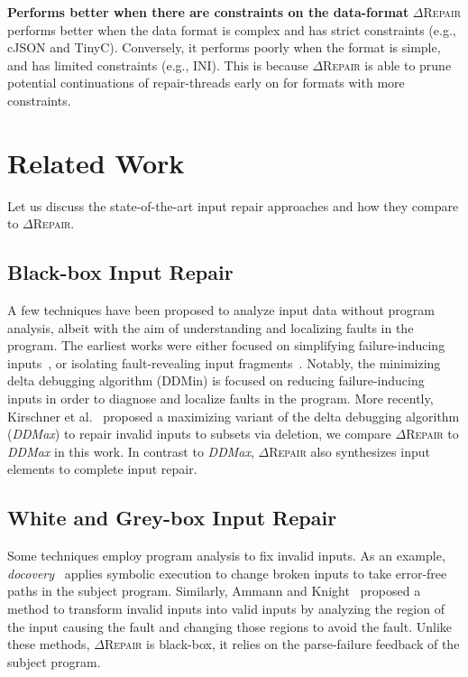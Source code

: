 \documentclass[acmsmall,screen,review,anonymous]{acmart}
\newcommand{\ddmin}{\textit{ddmin}\xspace}
\newcommand{\approach}{\textsc{$\Delta$Repair}\xspace}
\def\ddmin{DDMin\xspace}
\newcommand{\ddmax}{\textit{DDMax}\xspace}
\newcommand{\drepair}{\approach}
\begin{document}
\noindent\textbf{Performs better when there are constraints on the data-format}
\drepair performs better when the data format is complex and has strict constraints (e.g., cJSON and TinyC).
Conversely, it performs poorly when the format is simple, and has
limited constraints (e.g., INI). This is because \drepair is able to prune
potential continuations of repair-threads early on for formats with
more constraints.

\section{Related Work}
\label{sec:relatedwork}

Let us discuss the state-of-the-art input repair approaches and how they compare to \approach. 

\subsection{Black-box Input Repair} 
A few techniques have been proposed to analyze input data without program analysis, albeit with the aim of understanding and localizing faults in the program. The earliest works were either focused on simplifying failure-inducing inputs~\cite{zeller2002simplifying, clause2009penumbra}, or isolating fault-revealing input fragments~\cite{hierarchicalDD, sterling2007automated}. Notably, the minimizing delta debugging algorithm (\ddmin) is focused on reducing failure-inducing inputs in order to diagnose and localize faults in the program. More recently, Kirschner et al.~\cite{kirschner2020debugging} proposed a maximizing variant of the delta debugging algorithm (\ddmax) to repair invalid inputs to subsets via deletion, we compare \approach to \ddmax in this work. In contrast to \ddmax, \approach also synthesizes input elements to complete input repair. 


\subsection{White and Grey-box Input Repair} Some techniques employ program analysis to fix invalid inputs. As an example, \emph{docovery}~\cite{docovery:ase14} applies symbolic execution to change broken inputs to take error-free paths in the subject program. Similarly, Ammann and Knight~\cite{data_diversity} proposed a method to transform invalid inputs into valid inputs by analyzing the region of the input causing the fault and changing those regions to avoid the fault. Unlike these methods, \approach 
is black-box, it relies on the parse-failure feedback of the subject program. 
\end{document}
